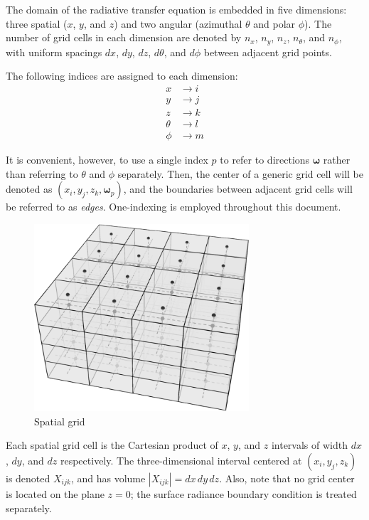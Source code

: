 \documentclass[ms,cpyr,lof,lot]{uathesis}
\newcommand\abs[1]{\left| #1 \right|}
\renewcommand\vec\bm
\begin{document}
The domain of the radiative transfer equation is embedded in five dimensions: three spatial ($x$, $y$, and $z$) and two angular (azimuthal $\theta$ and polar $\phi$).
The number of grid cells in each dimension are denoted by $n_x$, $n_y$, $n_z$,
$n_\theta$, and $n_\phi$, with uniform spacings $dx$, $dy$, $dz$, $d\theta$, and
$d\phi$ between adjacent grid points.

The following indices are assigned to each dimension:
\begin{align*}
  x &\to i \\
  y &\to j \\
  z &\to k \\
  \theta &\to l \\
  \phi &\to m
\end{align*}

It is convenient, however, to use a single index $p$ to refer to directions $\vec{\omega}$ rather than referring to $\theta$ and $\phi$ separately.
Then, the center of a generic grid cell will be denoted as
$(x_i, y_j, z_k, \vec{\omega}_p)$, and the boundaries between adjacent grid cells
will be referred to as \textit{edges}.
One-indexing is employed throughout this document.

\begin{figure}[H]
  \centering
  \includegraphics[width=8cm]{spatialgrid.pdf}
  \caption{Spatial grid}
  \label{fig:spatial_grid}
\end{figure}

Each spatial grid cell is the Cartesian product of $x$, $y$, and $z$ intervals of width $dx$, $dy$, and $dz$ respectively.
The three-dimensional interval centered at $(x_i, y_j, z_k)$ is denoted $X_{ijk}$, and has volume $\abs{X_{ijk}}=dx\,dy\,dz$.
Also, note that no grid center is located on the plane $z=0$; the surface radiance boundary condition is treated separately.
\end{document}
